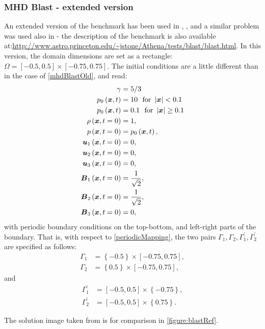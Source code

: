 \subsubsection{MHD Blast - extended version}
\label{sec:blastNew}
An extended version of the benchmark has been used in \cite{blastNew1}, \cite{athenaBlast}, and a similar problem was used also in \cite{blastNew2} - the description of the benchmark is also available at:\url{http://www.astro.princeton.edu/~jstone/Athena/tests/blast/blast.html}.
In this version, the domain dimensions are set as a rectangle: $\Omega = [-0.5, 0.5] \times [-0.75, 0.75]$.
The initial conditions are a little different than in the case of \cref{mhdBlastOld}, and read:
\begin{align}
\label{mhdBlastNew}
\gamma & =  5 / 3\\ \nonumber
p_0\left(\mbox{\boldmath $x$}, t\right) & =  10\ \ \text{for}\ \left|\mbox{\boldmath $x$}\right| < 0.1\\ \nonumber
p_0\left(\mbox{\boldmath $x$}, t\right) & =  0.1\ \ \text{for}\ \left|\mbox{\boldmath $x$}\right| \geq 0.1\\ \nonumber
\rho\left(\mbox{\boldmath $x$}, t = 0\right) & =  1,\\ \nonumber
p\left(\mbox{\boldmath $x$}, t = 0\right) & =  p_0\left(\mbox{\boldmath $x$}, t\right),\\ \nonumber
\mbox{\boldmath $u$}_1\left(\mbox{\boldmath $x$}, t = 0\right) & =  0,\\ \nonumber	
\mbox{\boldmath $u$}_2\left(\mbox{\boldmath $x$}, t = 0\right) & =  0,\\ \nonumber
\mbox{\boldmath $u$}_3\left(\mbox{\boldmath $x$}, t = 0\right) & =  0,\\ \nonumber
\mbox{\boldmath $B$}_1\left(\mbox{\boldmath $x$}, t = 0\right) & =  \frac{1}{\sqrt{2}},\\ \nonumber
\mbox{\boldmath $B$}_2\left(\mbox{\boldmath $x$}, t = 0\right) & =  \frac{1}{\sqrt{2}},\\ \nonumber
\mbox{\boldmath $B$}_3\left(\mbox{\boldmath $x$}, t = 0\right) & =  0,
\end{align}
with periodic boundary conditions on the top-bottom, and left-right parts of the boundary. That is, with respect to \cref{periodicMapping}, the two pairs $\Gamma_1, \Gamma_2, \Gamma_1^{'}, \Gamma_2^{'}$ are specified as follows:
\begin{align}
\Gamma_1 & = \left\{-0.5\right\} \times [-0.75, 0.75],\\
\Gamma_2 & = \left\{0.5\right\} \times [-0.75, 0.75],
\end{align}
and
\begin{align}
\Gamma_1^{'} & = [-0.5, 0.5] \times \left\{-0.75\right\},\\
\Gamma_2^{'} & = [-0.5, 0.5] \times \left\{0.75\right\}.
\end{align}

The solution image taken from \cite{blastNew1} is for comparison in \cref{figure:blastRef}.


